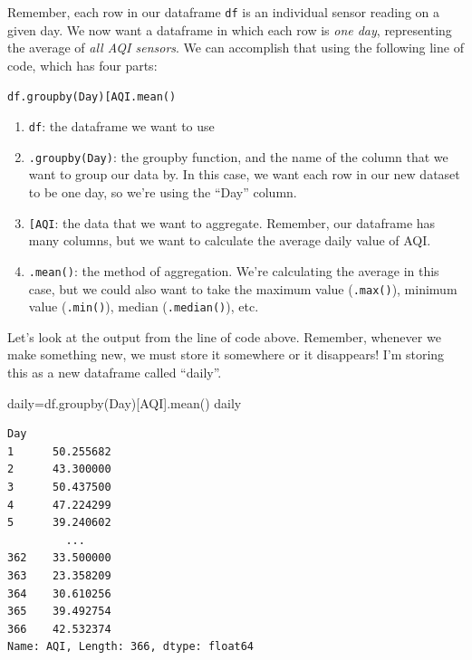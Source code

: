 \documentclass[
  letterpaper,
  DIV=11,
  numbers=noendperiod]{scrreprt}
\newenvironment{Shaded}{\begin{snugshade}}{\end{snugshade}}
\newcommand{\NormalTok}[1]{\textcolor[rgb]{0.00,0.23,0.31}{#1}}
\newcommand{\OperatorTok}[1]{\textcolor[rgb]{0.37,0.37,0.37}{#1}}
\newcommand{\StringTok}[1]{\textcolor[rgb]{0.13,0.47,0.30}{#1}}
\providecommand{\tightlist}{%
  \setlength{\itemsep}{0pt}\setlength{\parskip}{0pt}}\usepackage{longtable,booktabs,array}
\begin{document}
Remember, each row in our dataframe \texttt{df} is an individual sensor
reading on a given day. We now want a dataframe in which each row is
\emph{one day}, representing the average of \emph{all AQI sensors}. We
can accomplish that using the following line of code, which has four
parts:

\texttt{df.groupby(\textquotesingle{}Day\textquotesingle{}){[}\textquotesingle{}AQI\textquotesingle{}{]}.mean()}

\begin{enumerate}
\def\labelenumi{\arabic{enumi}.}
\tightlist
\item
  \texttt{df}: the dataframe we want to use
\item
  \texttt{.groupby(\textquotesingle{}Day\textquotesingle{})}: the
  groupby function, and the name of the column that we want to group our
  data by. In this case, we want each row in our new dataset to be one
  day, so we're using the ``Day'' column.
\item
  \texttt{{[}\textquotesingle{}AQI\textquotesingle{}{]}}: the data that
  we want to aggregate. Remember, our dataframe has many columns, but we
  want to calculate the average daily value of AQI.
\item
  \texttt{.mean()}: the method of aggregation. We're calculating the
  average in this case, but we could also want to take the maximum value
  (\texttt{.max()}), minimum value (\texttt{.min()}), median
  (\texttt{.median()}), etc.
\end{enumerate}

Let's look at the output from the line of code above. Remember, whenever
we make something new, we must store it somewhere or it disappears! I'm
storing this as a new dataframe called ``daily''.

\begin{Shaded}
\begin{Highlighting}[]
\NormalTok{daily}\OperatorTok{=}\NormalTok{df.groupby(}\StringTok{\textquotesingle{}Day\textquotesingle{}}\NormalTok{)[}\StringTok{\textquotesingle{}AQI\textquotesingle{}}\NormalTok{].mean()}
\NormalTok{daily}
\end{Highlighting}
\end{Shaded}

\begin{verbatim}
Day
1      50.255682
2      43.300000
3      50.437500
4      47.224299
5      39.240602
         ...    
362    33.500000
363    23.358209
364    30.610256
365    39.492754
366    42.532374
Name: AQI, Length: 366, dtype: float64
\end{verbatim}
\end{document}
